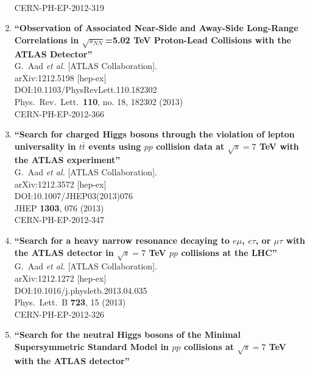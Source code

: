 \documentclass{article}
\begin{document}
\begin{enumerate}
  \\{}CERN-PH-EP-2012-319
\item%
{\bf ``Observation of Associated Near-Side and Away-Side Long-Range Correlations in $\sqrt{s_{NN}}$=5.02  TeV Proton-Lead Collisions with the ATLAS Detector''}
  \\{}G.~Aad {\it et al.} [ATLAS Collaboration].
  \\{}arXiv:1212.5198 [hep-ex]
  \\{}DOI:10.1103/PhysRevLett.110.182302
  \\{}Phys.\ Rev.\ Lett.\  {\bf 110}, no. 18, 182302 (2013)
  \\{}CERN-PH-EP-2012-366
\item%
{\bf ``Search for charged Higgs bosons through the violation of lepton universality in $t\bar{t}$ events using $pp$ collision data at $\sqrt{s}=7$ TeV with the ATLAS experiment''}
  \\{}G.~Aad {\it et al.} [ATLAS Collaboration].
  \\{}arXiv:1212.3572 [hep-ex]
  \\{}DOI:10.1007/JHEP03(2013)076
  \\{}JHEP {\bf 1303}, 076 (2013)
  \\{}CERN-PH-EP-2012-347
\item%
{\bf ``Search for a heavy narrow resonance decaying to $e \mu$, $e \tau$, or $\mu \tau$ with the ATLAS detector in $\sqrt{s}=7$ TeV $pp$ collisions at the LHC''}
  \\{}G.~Aad {\it et al.} [ATLAS Collaboration].
  \\{}arXiv:1212.1272 [hep-ex]
  \\{}DOI:10.1016/j.physletb.2013.04.035
  \\{}Phys.\ Lett.\ B {\bf 723}, 15 (2013)
  \\{}CERN-PH-EP-2012-326
\item%
{\bf ``Search for the neutral Higgs bosons of the Minimal Supersymmetric Standard Model in $pp$ collisions at $\sqrt{s}=7$ TeV with the ATLAS detector''}

\end{enumerate}
\end{document}
